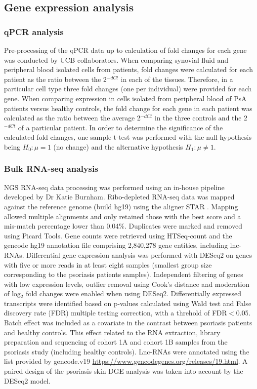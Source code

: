 \subsection{Gene expression analysis}

\subsubsection{qPCR analysis}
Pre-processing of the qPCR data up to calculation of fold changes for each gene was conducted by UCB collaborators. When comparing synovial fluid and peripheral blood isolated cells from patients, fold changes were calculated for each patient as the ratio between the 2$^{-dCt}$ in each of the tissues. Therefore, in a particular cell type three fold changes (one per individual) were provided for each gene. When comparing expression in cells isolated from peripheral blood of PsA patients versus healthy controls, the fold change for each gene in each patient was calculated as the ratio between the average 2$^{-dCt}$ in the three controls and the 2$^{-dCt}$ of a particular patient. In order to determine the significance of the calculated fold changes, one sample t-test was performed with the null hypothesis being $H_0:\mu=1$ (no change) and the alternative hypothesis $H_1:\mu\neq 1$. 


\subsubsection{Bulk RNA-seq analysis}
NGS RNA-seq data processing was performed using an in-house pipeline developed by Dr Katie Burnham. Ribo-depleted RNA-seq data was mapped against the reference genome (build hg19) using the aligner STAR \parencite{Dobin2013}. Mapping allowed multiple alignments and only retained those with the best score and a mis-match percentage lower than 0.04\%. Duplicates were marked and removed using Picard Tools. Gene counts were retrieved using HTSeq-count and the gencode hg19 annotation file comprising 2,840,278 gene entities, including lnc-RNAs. Differential gene expression analysis was performed with DESeq2 on genes with five or more reads in at least eight samples (smallest group size corresponding to the psoriasis patients samples). Independent filtering of genes with low expression levels, outlier removal using Cook's distance and moderation of log$_2$ fold changes were enabled when using DESeq2. Differentially expressed transcripts were identified based on p-values calculated using Wald test and False discovery rate (FDR) multiple testing correction, with a threhold of FDR$<$0.05. Batch effect was included as a covariate in the contrast between psoriasis patients and healthy controls. This effect related to the RNA extraction, library preparation and sequencing of cohort 1A and cohort 1B samples from the psoriasis study (including healthy controls). Lnc-RNAs were annotated using the list provided by gencode.v19 \url{https://www.gencodegenes.org/releases/19.html}. A paired design of the psoriasis skin DGE analysis was taken into account by the DESeq2 model.



